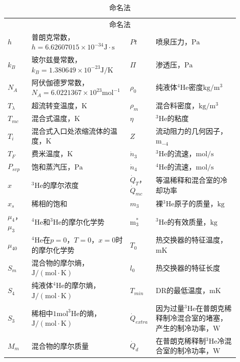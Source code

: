 \begin{table}[!htbp]
	\centering
	\caption{命名法}
	\label{T1}
	\begin{tabular}{m{0.1\linewidth}m{0.35\linewidth}m{0.1\linewidth}m{0.35\linewidth}}
		\toprule
		\multicolumn{4}{c}{命名法} \\
		$h$ & 普朗克常数，$h=6.62607015\times10^{-34}\mathrm{J\cdot s}$ & $Pt$ & 喷泉压力，$\mathrm{Pa}$ \\
		$k_B$ & 玻尔兹曼常数，$k_B=1.380649\times10^{-23}\mathrm{J/K}$ & $\Pi$ & 渗透压，$\mathrm{Pa}$ \\
		$N_A$ & 阿伏伽德罗常数，$N_A=6.0221367\times 10^{23}\mathrm{mol^{-1}}$ & $\rho_0$ & 纯液体$\mathrm{^4He}$密度$\mathrm{kg/m^3}$ \\
		$T_\lambda$ & 超流转变温度，$\mathrm{K}$ & $\rho_m$ &混合料密度，$\mathrm{kg/m^3}$ \\
		$T_{mc}$ & 混合式温度，$\mathrm{K}$ & $\eta$ & $^3\mathrm{He}$的粘度 \\
		$T_i$ & 混合式入口处浓缩流体的温度，$\mathrm{K}$ & $Z$ & 流动阻力的几何因子，$\mathrm{m_{-4}}$ \\
		$T_F$ & 费米温度，$\mathrm{K}$ & $\dot{n}_3$ & $\mathrm{^3He}$的流速，$\mathrm{mol/s}$ \\ 
		$P_{svp}$ & 饱和蒸汽压，$\mathrm{Pa}$ & $\dot{n}_4$ & $\mathrm{^4He}$的流速，$\mathrm{mol/s}$ \\
		$x$ & $\mathrm{^3He}$的摩尔浓度 & $\dot{Q}_T$，$\dot{Q}_{mc}$ & 等温稀释和混合室的冷却功率 \\
		$x_s$ &稀相的饱和&$m_3$& 裸$\mathrm{^3He}$原子的质量，$\mathrm{kg}$ \\
		$\mu_4$，$\mu_3$ & $\mathrm{^4He}$和$\mathrm{^3He}$的摩尔化学势 & $\mathrm{m_3^*}$ & $\mathrm{^3He}$的有效质量，$\mathrm{kg}$ \\
		$\mu_{40}$ & $\mathrm{^4He}$在$p=0$，$T=0$，$x=0$时的摩尔化学势 & $T_0$ & 热交换器的特征温度，$\mathrm{mK}$ \\
		$S_m$ & 混合物的摩尔熵，$\mathrm{J/(mol\cdot K)}$ & $l_0$ & 热交换器的特征长度 \\
		$S_4$ & 纯液体$\mathrm{^4He}$的摩尔熵，$\mathrm{J/(mol\cdot K)}$ & $T_{min}$ & DR的最低温度，$\mathrm{mK}$ \\
		$S_3$ & 稀相中$\mathrm{1 mol ^3He}$的熵，$\mathrm{J/(mol\cdot K)}$ & $\dot{Q}_{extra}$ & 因为过量$\mathrm{^3He}$在普朗克稀释制冷混合室的堵塞，产生的制冷功率，$\mathrm{W}$ \\
		$M_m$ & 混合物的摩尔质量 & $\dot{Q}_d$ & 在普朗克稀释制$\mathrm{^3He}$冷混合室的制冷功率，$\mathrm{W}$ \\

\end{tabular}
\end{table}
